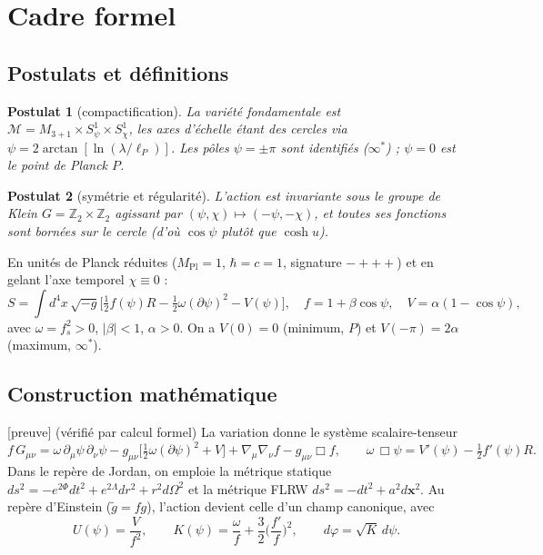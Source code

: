 \documentclass[11pt,a4paper]{article}
\newcommand{\statut}[1]{{\footnotesize\textsf{[#1]}}}
\newcommand{\Mpl}{M_{\mathrm{Pl}}}
\theoremstyle{plain}
\newtheorem{postulat}{Postulat}
\theoremstyle{remark}
\begin{document}
\section{Cadre formel}
\subsection{Postulats et d\'efinitions}
\begin{postulat}[compactification]
La vari\'et\'e fondamentale est $\mathcal{M}=M_{3+1}\times S^1_\psi\times S^1_\chi$, les
axes d'\'echelle \'etant des cercles via $\psi=2\arctan[\ln(\lambda/\ell_P)]$. Les p\^oles
$\psi=\pm\pi$ sont identifi\'es ($\infty^*$) ; $\psi=0$ est le point de Planck $P$.
\end{postulat}
\begin{postulat}[sym\'etrie et r\'egularit\'e]
L'action est invariante sous le groupe de Klein $G=\mathbb{Z}_2\times\mathbb{Z}_2$
agissant par $(\psi,\chi)\mapsto(-\psi,-\chi)$, et toutes ses fonctions sont born\'ees
sur le cercle (d'o\`u $\cos\psi$ plut\^ot que $\cosh u$).
\end{postulat}
En unit\'es de Planck r\'eduites ($\Mpl=1$, $\hbar=c=1$, signature $-+++$) et en gelant
l'axe temporel $\chi\equiv0$ :
\begin{equation}
S=\int d^4x\,\sqrt{-g}\Big[\tfrac12 f(\psi)R-\tfrac12\omega(\partial\psi)^2-V(\psi)\Big],
\quad f=1+\beta\cos\psi,\quad V=\alpha(1-\cos\psi),
\end{equation}
avec $\omega=f_s^2>0$, $|\beta|<1$, $\alpha>0$. On a $V(0)=0$ (minimum, $P$) et
$V(-\pi)=2\alpha$ (maximum, $\infty^*$).

\subsection{Construction math\'ematique}
\statut{preuve} (v\'erifi\'e par calcul formel) La variation donne le syst\`eme
scalaire-tenseur
\begin{equation}
f\,G_{\mu\nu}=\omega\,\partial_\mu\psi\,\partial_\nu\psi
-g_{\mu\nu}\big[\tfrac12\omega(\partial\psi)^2+V\big]+\nabla_\mu\nabla_\nu f-g_{\mu\nu}\Box f,
\qquad \omega\,\Box\psi=V'(\psi)-\tfrac12 f'(\psi)R.
\end{equation}
Dans le repère de Jordan, on emploie la m\'etrique statique
$ds^2=-e^{2\Phi}dt^2+e^{2\Lambda}dr^2+r^2d\Omega^2$ et la m\'etrique FLRW
$ds^2=-dt^2+a^2d\mathbf{x}^2$. Au repère d'Einstein ($\tilde g=f g$), l'action devient
celle d'un champ canonique, avec
\begin{equation}
U(\psi)=\frac{V}{f^2},\qquad K(\psi)=\frac{\omega}{f}+\frac32\Big(\frac{f'}{f}\Big)^2,
\qquad d\varphi=\sqrt{K}\,d\psi.
\end{equation}
\end{document}

